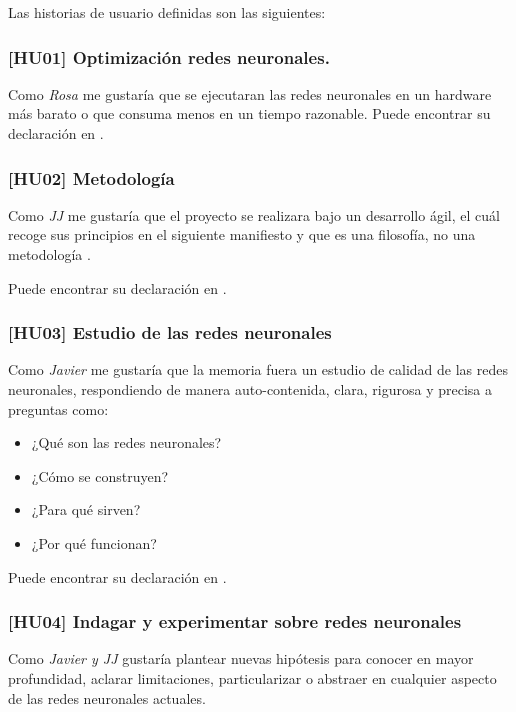 Las historias de usuario definidas son las siguientes: 

\subsubsection*{[HU01] Optimización redes neuronales.}\label{HU01}
    Como \textit{Rosa} me gustaría que se ejecutaran las redes neuronales en un hardware
    más barato o que consuma menos en un tiempo razonable.
Puede encontrar su declaración en \cite{TFG-Estudio-de-las-redes-neuronales-HU01}. 

\subsubsection*{ [HU02] Metodología} \label{HUO2}

Como \textit{JJ} me gustaría que el proyecto se realizara bajo un desarrollo ágil,  el cuál recoge sus principios en el siguiente manifiesto \cite{principios-manifiesto-agil} y que es una filosofía, no una metodología \cite{why-agile-is-not-a-methodology-1} \cite{why-agile-is-not-a-methodology-2}.

Puede encontrar su declaración en \cite{TFG-Estudio-de-las-redes-neuronales-HU02}.  

\subsubsection*{ [HU03] Estudio de las redes neuronales} \label{HUO3}
Como \textit{Javier} me gustaría que la memoria fuera un estudio de calidad de las redes neuronales, 
respondiendo de manera auto-contenida, clara, rigurosa y precisa a preguntas como:
\begin{itemize}
    \item ¿Qué son las redes neuronales?
    \item ¿Cómo se construyen?
    \item ¿Para qué sirven?
    \item ¿Por qué funcionan?
\end{itemize}
Puede encontrar su declaración en \cite{TFG-Estudio-de-las-redes-neuronales-HU03}.

\subsubsection*{ [HU04] Indagar y experimentar sobre redes neuronales} \label{HUO4}

Como \textit{Javier y JJ} gustaría plantear nuevas hipótesis para conocer en mayor profundidad, 
aclarar limitaciones, particularizar o abstraer en cualquier aspecto de las redes neuronales actuales.

